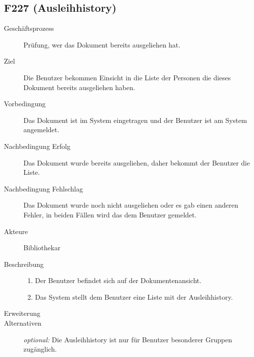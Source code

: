 \subsection{F227 (Ausleihhistory)}
\begin{description}
  \item[Geschäftsprozess]Prüfung, wer das Dokument bereits ausgeliehen hat.
  \item[Ziel]Die Benutzer bekommen Einsicht in die Liste der Personen die dieses Dokument bereits ausgeliehen haben.
  \item[Vorbedingung]Das Dokument ist im System eingetragen und der Benutzer ist am System angemeldet.
  \item[Nachbedingung Erfolg]Das Dokument wurde bereits ausgeliehen, daher bekommt der Benutzer die Liste.
  \item[Nachbedingung Fehlschlag]Das Dokument wurde noch nicht ausgeliehen oder es gab einen anderen Fehler, in beiden Fällen wird das dem Benutzer gemeldet.
  \item[Akteure]Bibliothekar
  \item[Beschreibung]\hfill
    \begin{enumerate}
      \item Der Benutzer befindet sich auf der Dokumentenansicht.
      \item Das System stellt dem Benutzer eine Liste mit der Ausleihhistory.
    \end{enumerate}
  \item[Erweiterung]
  \item[Alternativen]\emph{optional:} Die Ausleihhistory ist nur für Benutzer besonderer Gruppen zugänglich.
\end{description}


